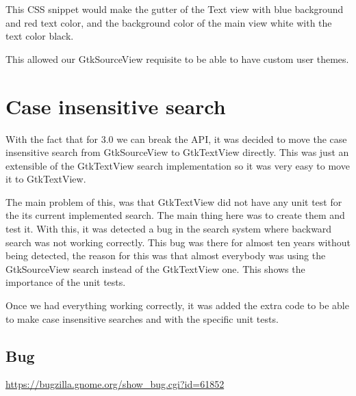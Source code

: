 This CSS snippet would make the gutter of the Text view with blue background and red text color, and the background color of the main view white with the text color black.

This allowed our GtkSourceView requisite to be able to have custom user themes.

\section{Case insensitive search}

With the fact that for 3.0 we can break the API, it was decided to move the case insensitive search from GtkSourceView to GtkTextView directly. This was just an extensible of the GtkTextView search implementation so it was very easy to move it to GtkTextView.

The main problem of this, was that GtkTextView did not have any unit test for the its current implemented search. The main thing here was to create them and test it. With this, it was detected a bug in the search system where backward search was not working correctly. This bug was there for almost ten years without being detected, the reason for this was that almost everybody was using the GtkSourceView search instead of the GtkTextView one. This shows the importance of the unit tests.

Once we had everything working correctly, it was added the extra code to be able to make case insensitive searches and with the specific unit tests.

\subsection{Bug}

\noindent\url{https://bugzilla.gnome.org/show_bug.cgi?id=61852}

